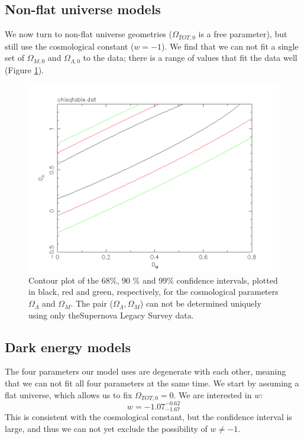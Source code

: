 \documentclass[11pt]{article}
\begin{document}
\subsection{Non-flat universe models} \label{sec:nonflat}
We now turn to non-flat universe geometries ($\Omega_{TOT,0} $ is a free parameter), but still use the cosmological constant ($w = -1$). We find that we can not fit a single set of $\Omega_{M,0}$ and $\Omega_{\Lambda,0}$ to the data; there is a range of values that fit the data well (Figure \ref{fig:nonflat}). 
\begin{figure}[htbp]
	\centering
	\includegraphics[width=0.8\linewidth]{nonflat.png}
	\caption{Contour plot of the 68\%, 90 \% and 99\% confidence intervals, plotted in black, red and green, respectively, for the cosmological parameters $\Omega_\Lambda$ and $\Omega_M$. The pair ($\Omega_\Lambda, \Omega_M$) can not be determined uniquely using only theSupernova Legacy Survey data.}
	\label{fig:nonflat}
\end{figure}

\subsection{Dark energy models} \label{sec:dark}
The four parameters our model uses are degenerate with each other, meaning that we can not fit all four parameters at the same time. We start by assuming a flat universe, which allows us to fix $\Omega_{TOT,0} = 0$. We are interested in $w$:
\begin{equation}
	w= -1.07^{-0.62}_{-1.67}
	\label{res:w}
\end{equation}
This is consistent with the cosmological constant, but the confidence interval is large, and thus we can not yet exclude the possibility of $w \neq -1$.
\end{document}
